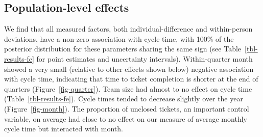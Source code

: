 \documentclass[manuscript,screen,review]{acmart}
\begin{document}
\subsection{Population-level effects}\label{population-level-effects}

We find that all measured factors, both individual-difference and
within-person deviations, have a non-zero association with cycle time,
with 100\% of the posterior distribution for these parameters sharing
the same sign (see Table~\ref{tbl-results-fe} for point estimates and
uncertainty intervals). Within-quarter month showed a very small
(relative to other effects shown below) negative association with cycle
time, indicating that time to ticket completion is shorter at the end of
quarters (Figure~\ref{fig-quarter}). Team size had almost to no effect
on cycle time (Table~\ref{tbl-results-fe}). Cycle times tended to
decrease slightly over the year (Figure~\ref{fig-month}). The proportion
of unclosed tickets, an important control variable, on average had close
to no effect on our measure of average monthly cycle time but interacted
with month.

\providecommand{\ascline}[3]{\noalign{\global\arrayrulewidth #1}\arrayrulecolor[HTML]{#2}\cline{#3}}
\end{document}
